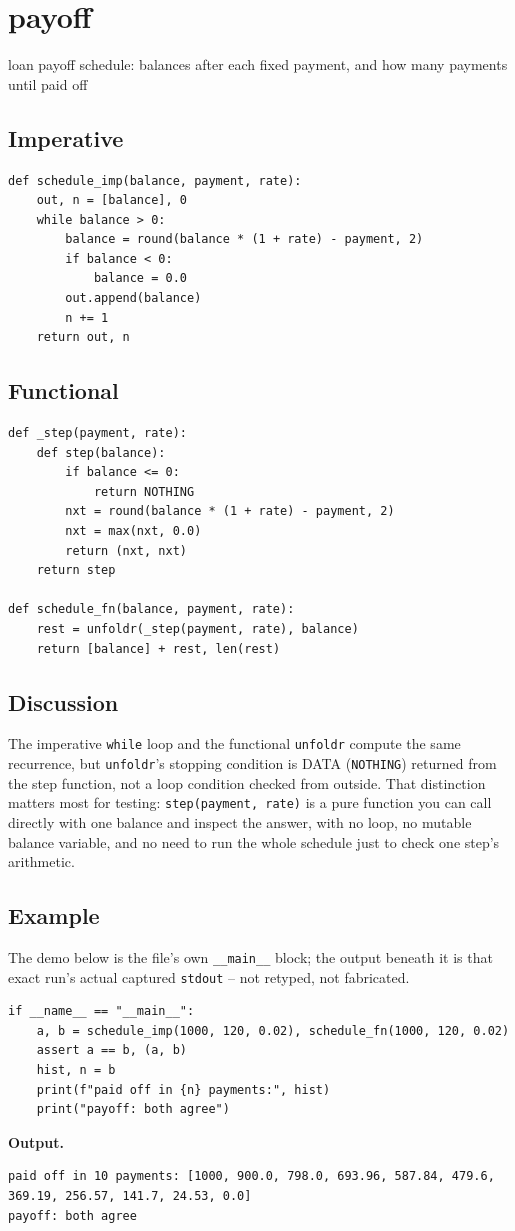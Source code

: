 \documentclass[10pt,letterpaper]{book}
\begin{document}
\chapter{payoff}
loan payoff schedule: balances after each fixed payment, and how many payments until paid off

\section*{Imperative}
\begin{lstlisting}[style=code]
def schedule_imp(balance, payment, rate):
    out, n = [balance], 0
    while balance > 0:
        balance = round(balance * (1 + rate) - payment, 2)
        if balance < 0:
            balance = 0.0
        out.append(balance)
        n += 1
    return out, n
\end{lstlisting}
\section*{Functional}
\begin{lstlisting}[style=code]
def _step(payment, rate):
    def step(balance):
        if balance <= 0:
            return NOTHING
        nxt = round(balance * (1 + rate) - payment, 2)
        nxt = max(nxt, 0.0)
        return (nxt, nxt)
    return step

def schedule_fn(balance, payment, rate):
    rest = unfoldr(_step(payment, rate), balance)
    return [balance] + rest, len(rest)
\end{lstlisting}
\section*{Discussion}

The imperative \texttt{while} loop and the functional \texttt{unfoldr}
compute the same recurrence, but \texttt{unfoldr}'s stopping condition is
DATA (\texttt{NOTHING}) returned from the step function, not a loop
condition checked from outside. That distinction matters most for
testing: \texttt{step(payment, rate)} is a pure function you can call
directly with one balance and inspect the answer, with no loop, no
mutable balance variable, and no need to run the whole schedule just to
check one step's arithmetic.

\section*{Example}
The demo below is the file's own \texttt{\_\_main\_\_} block; the output beneath it is that exact run's actual captured \texttt{stdout} -- not retyped, not fabricated.
\begin{lstlisting}[style=code]
if __name__ == "__main__":
    a, b = schedule_imp(1000, 120, 0.02), schedule_fn(1000, 120, 0.02)
    assert a == b, (a, b)
    hist, n = b
    print(f"paid off in {n} payments:", hist)
    print("payoff: both agree")
\end{lstlisting}
\noindent\textbf{Output.}
\begin{lstlisting}[style=ex]
paid off in 10 payments: [1000, 900.0, 798.0, 693.96, 587.84, 479.6, 369.19, 256.57, 141.7, 24.53, 0.0]
payoff: both agree
\end{lstlisting}
\end{document}
